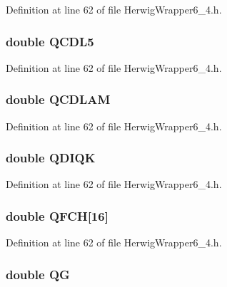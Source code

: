 Definition at line 62 of file Herwig\-Wrapper6\_\-4.h.
\subsubsection{\setlength{\rightskip}{0pt plus 5cm}double {\bf QCDL5}}\label{HerwigWrapper6__4_8h_410cb6e04ae40419b55ebeb3f8a36046}




Definition at line 62 of file Herwig\-Wrapper6\_\-4.h.
\subsubsection{\setlength{\rightskip}{0pt plus 5cm}double {\bf QCDLAM}}\label{HerwigWrapper6__4_8h_c0ada43db4b11874fc6392cc79af1cc8}




Definition at line 62 of file Herwig\-Wrapper6\_\-4.h.
\subsubsection{\setlength{\rightskip}{0pt plus 5cm}double {\bf QDIQK}}\label{HerwigWrapper6__4_8h_16c1dd8599fc676857c43f4626574e34}




Definition at line 62 of file Herwig\-Wrapper6\_\-4.h.
\subsubsection{\setlength{\rightskip}{0pt plus 5cm}double {\bf QFCH}[16]}\label{HerwigWrapper6__4_8h_03f0b42e56d591a5ab3b56085ab7efe2}




Definition at line 62 of file Herwig\-Wrapper6\_\-4.h.
\subsubsection{\setlength{\rightskip}{0pt plus 5cm}double {\bf QG}}\label{HerwigWrapper6__4_8h_5ff0d218b20836c5faf561834ee828c0}




